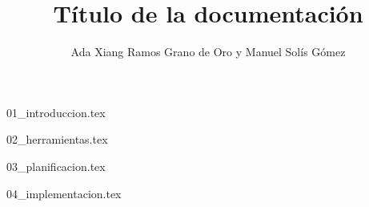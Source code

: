 \documentclass[twoside, openright, minitoc, hidelinks, headlogo, framedcover]{tfeEPCC}
\title{Título de la documentación}
\author{Ada Xiang Ramos Grano de Oro y Manuel Solís Gómez}
\begin{document}
\maketitle

\newpage
\pagestyle{plain}
\setcounter{page}{1}
\tableofcontents
\newpage

\pagestyle{fancy}

\setcounter{page}{1}

{01_introduccion.tex}


{02_herramientas.tex}

{03_planificacion.tex}

{04_implementacion.tex}

\startappendices

\makebibliography
\end{document}
